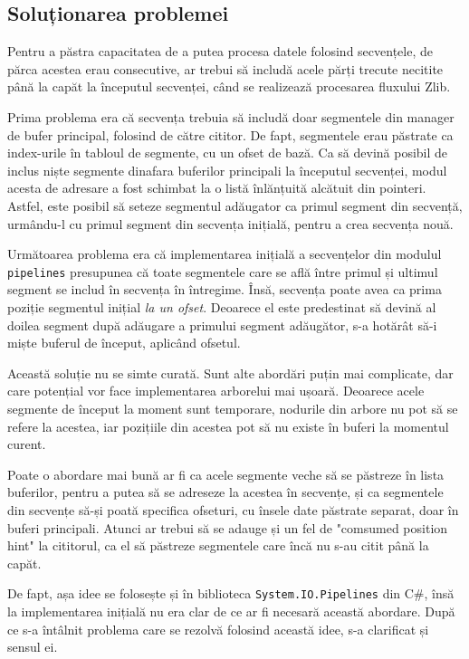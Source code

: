 \documentclass[a4paper,12pt]{report}
\begin{document}
\subsection{Soluționarea problemei}

Pentru a păstra capacitatea de a putea procesa datele folosind secvențele,
de părca acestea erau consecutive, ar trebui să includă acele părți trecute necitite până la capăt
la începutul secvenței, când se realizează procesarea fluxului Zlib.

Prima problema era că secvența trebuia să includă doar segmentele din manager de bufer principal,
folosind de către cititor.
De fapt, segmentele erau păstrate ca index-urile în tabloul de segmente, cu un ofset de bază.
Ca să devină posibil de inclus niște segmente dinafara buferilor principali la începutul secvenței,
modul acesta de adresare a fost schimbat la o listă înlănțuită alcătuit din pointeri.
Astfel, este posibil să seteze segmentul adăugator ca primul segment din secvență, urmându-l cu
primul segment din secvența inițială, pentru a crea secvența nouă.

Următoarea problema era că implementarea inițială a secvențelor din modulul \texttt{pipelines} presupunea
că toate segmentele care se află între primul și ultimul segment se includ în secvența în întregime.
Însă, secvența poate avea ca prima poziție segmentul inițial \textit{la un ofset}.
Deoarece el este predestinat să devină al doilea segment după adăugare a primului segment adăugător,
s-a hotărât să-i miște buferul de început, aplicând ofsetul.

Această soluție nu se simte curată.
Sunt alte abordări puțin mai complicate, dar care potențial vor face implementarea arborelui mai ușoară.
Deoarece acele segmente de început la moment sunt temporare,
nodurile din arbore nu pot să se refere la acestea, iar pozițiile din acestea pot să nu existe în buferi la momentul curent.

Poate o abordare mai bună ar fi ca acele segmente veche să se păstreze în lista buferilor,
pentru a putea să se adreseze la acestea în secvențe,
și ca segmentele din secvențe să-și poată specifica ofseturi,
cu însele date păstrate separat, doar în buferi principali.
Atunci ar trebui să se adauge și un fel de "comsumed position hint" la cititorul,
ca el să păstreze segmentele care încă nu s-au citit până la capăt.

De fapt, așa idee se folosește și în biblioteca \texttt{System.IO.Pipelines} din C\#,
însă la implementarea inițială nu era clar de ce ar fi necesară această abordare.
După ce s-a întâlnit problema care se rezolvă folosind această idee, s-a clarificat și sensul ei.
\end{document}
